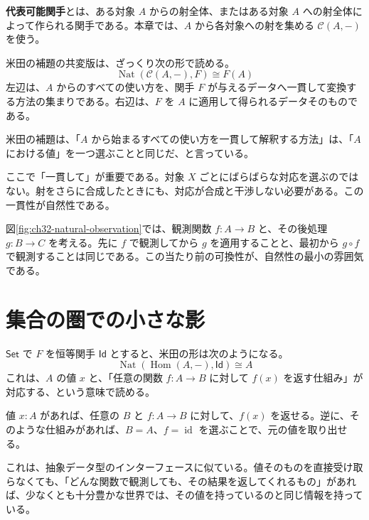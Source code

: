 \begin{definitionbox}
\textbf{代表可能関手}とは、ある対象 \(A\) からの射全体、またはある対象 \(A\) への射全体によって作られる関手である。本章では、\(A\) から各対象への射を集める \(\mathcal{C}(A,-)\) を使う。
\end{definitionbox}

米田の補題の共変版は、ざっくり次の形で読める。
\[
  \operatorname{Nat}(\mathcal{C}(A,-), F) \cong F(A)
\]
左辺は、\(A\) からのすべての使い方を、関手 \(F\) が与えるデータへ一貫して変換する方法の集まりである。右辺は、\(F\) を \(A\) に適用して得られるデータそのものである。

\begin{intuitionbox}
米田の補題は、「\(A\) から始まるすべての使い方を一貫して解釈する方法」は、「\(A\) における値」を一つ選ぶことと同じだ、と言っている。
\end{intuitionbox}

ここで「一貫して」が重要である。対象 \(X\) ごとにばらばらな対応を選ぶのではない。射をさらに合成したときにも、対応が合成と干渉しない必要がある。この一貫性が自然性である。


図\ref{fig:ch32-natural-observation}では、観測関数 \(f : A \to B\) と、その後処理 \(g : B \to C\) を考える。先に \(f\) で観測してから \(g\) を適用することと、最初から \(g \circ f\) で観測することは同じである。この当たり前の可換性が、自然性の最小の雰囲気である。

\section{集合の圏での小さな影}

\(\mathsf{Set}\) で \(F\) を恒等関手 \(\mathsf{Id}\) とすると、米田の形は次のようになる。
\[
  \operatorname{Nat}(\operatorname{Hom}(A,-), \mathsf{Id}) \cong A
\]
これは、\(A\) の値 \(x\) と、「任意の関数 \(f : A \to B\) に対して \(f(x)\) を返す仕組み」が対応する、という意味で読める。

値 \(x : A\) があれば、任意の \(B\) と \(f : A \to B\) に対して、\(f(x)\) を返せる。逆に、そのような仕組みがあれば、\(B = A\)、\(f = \operatorname{id}\) を選ぶことで、元の値を取り出せる。

\begin{softwarebox}
これは、抽象データ型のインターフェースに似ている。値そのものを直接受け取らなくても、「どんな関数で観測しても、その結果を返してくれるもの」があれば、少なくとも十分豊かな世界では、その値を持っているのと同じ情報を持っている。
\end{softwarebox}

